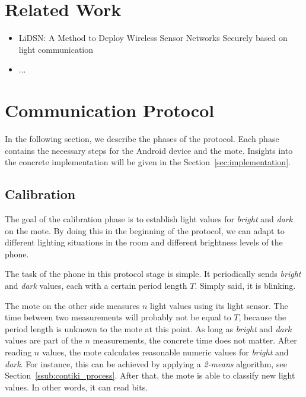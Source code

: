 \documentclass{sig-alternate} %
\begin{document}
\section{Related Work}
\label{sec:related_work}

\begin{itemize}
	\item LiDSN: A Method to Deploy Wireless Sensor Networks Securely based on light communication
	\item ...
\end{itemize}


\section{Communication Protocol}
\label{sec:communication_protocol}

In the following section, we describe the phases of the protocol.
Each phase contains the necessary steps for the Android device and the mote.
Insights into the concrete implementation will be given in the Section~\ref{sec:implementation}.

\subsection{Calibration}
\label{sub:calibration}

The goal of the calibration phase is to establish light values for \textit{bright} and \textit{dark} on the mote.
By doing this in the beginning of the protocol, we can adapt to different lighting situations in the room and different brightness levels of the phone.

The task of the phone in this protocol stage is simple.
It periodically sends \textit{bright} and \textit{dark} values, each with a certain period length $T$.
Simply said, it is blinking.

The mote on the other side measures $n$ light values using its light sensor.
The time between two measurements will probably not be equal to $T$, because the period length is unknown to the mote at this point.
As long as \textit{bright} and \textit{dark} values are part of the $n$ measurements, the concrete time does not matter.
After reading $n$ values, the mote calculates reasonable numeric values for \textit{bright} and \textit{dark}.
For instance, this can be achieved by applying a \mbox{\textit{2-means}} algorithm, see Section~\ref{ssub:contiki_process}.
After that, the mote is able to classify new light values.
In other words, it can read bits.
\end{document}
